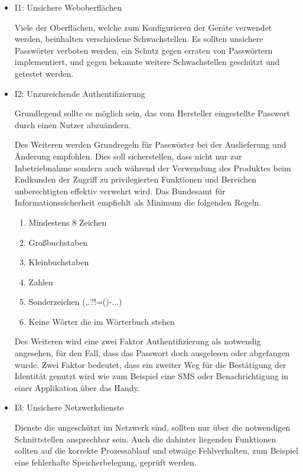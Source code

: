     \begin{itemize}
        \item I1: Unsichere Weboberflächen
        
        Viele der Oberflächen, welche zum Konfigurieren der Geräte verwendet werden, beinhalten verschiedene Schwachstellen.
        Es sollten unsichere Passwörter verboten werden, ein Schutz gegen erraten von Passwörtern implementiert, und gegen bekannte weitere Schwachstellen geschützt und getestet werden.
        
        \item I2: Unzureichende Authentifizierung
        
        Grundlegend sollte es möglich sein, das vom Hersteller eingestellte Passwort durch einen Nutzer abzuändern.
        
        Des Weiteren werden Grundregeln für Passwörter bei der Auslieferung und Änderung empfohlen. Dies soll sicherstellen, dass nicht nur zur Inbetriebnahme sondern auch während der Verwendung des Produktes beim Endkunden der Zugriff zu privilegierten Funktionen und Bereichen unberechtigten effektiv verwehrt wird. Das Bundesamt für Informationssicherheit \cite{bundesamt_fuer_sicherheit_in_der_informationstechnik_2018} 
        empfiehlt als Minimum die folgenden Regeln.
        \begin{enumerate}
            \item Mindestens 8 Zeichen
            \item Großbuchstaben
            \item Kleinbuchstaben
            \item Zahlen
            \item Sonderzeichen (,.?!=()-...)
            \item Keine Wörter die im Wörterbuch stehen
        \end{enumerate}
        
        Des Weiteren wird eine zwei Faktor Authentifizierung als notwendig angesehen, für den Fall, dass das Passwort doch ausgelesen oder abgefangen wurde. Zwei Faktor bedeutet, dass ein zweiter Weg für die Bestätigung der Identität genutzt wird wie zum Beispiel eine SMS oder Benachrichtigung in einer Applikation über das Handy.
        
        \item I3: Unsichere Netzwerkdienste
        
        Dienste die ungeschützt im Netzwerk sind, sollten nur über die notwendigen Schnittstellen ansprechbar sein.
        Auch die dahinter liegenden Funktionen sollten auf die korrekte Prozessablauf und etwaige Fehlverhalten, zum Beispiel eine fehlerhafte Speicherbelegung, geprüft werden.
        

\end{itemize}
